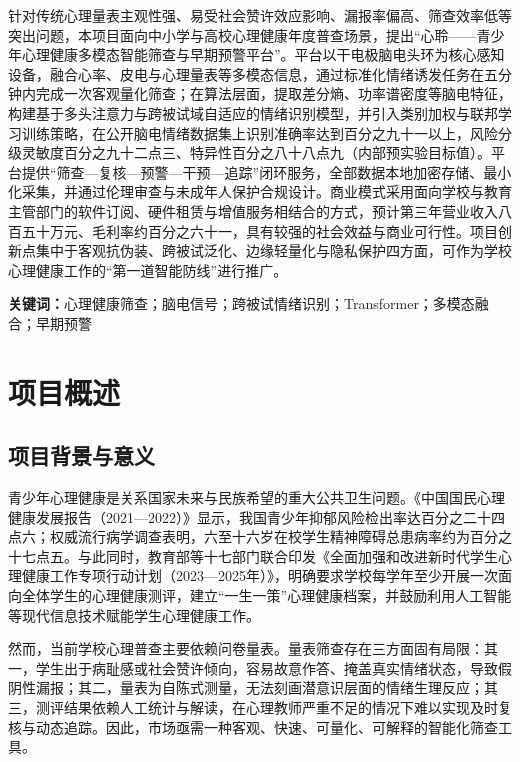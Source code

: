\documentclass[zihao=-4,fontset=windows,a4paper]{ctexart}
\begin{document}
针对传统心理量表主观性强、易受社会赞许效应影响、漏报率偏高、筛查效率低等突出问题，本项目面向中小学与高校心理健康年度普查场景，提出“心聆——青少年心理健康多模态智能筛查与早期预警平台”。平台以干电极脑电头环为核心感知设备，融合心率、皮电与心理量表等多模态信息，通过标准化情绪诱发任务在五分钟内完成一次客观量化筛查；在算法层面，提取差分熵、功率谱密度等脑电特征，构建基于多头注意力与跨被试域自适应的情绪识别模型，并引入类别加权与联邦学习训练策略，在公开脑电情绪数据集上识别准确率达到百分之九十一以上，风险分级灵敏度百分之九十二点三、特异性百分之八十八点九（内部预实验目标值）。平台提供“筛查—复核—预警—干预—追踪”闭环服务，全部数据本地加密存储、最小化采集，并通过伦理审查与未成年人保护合规设计。商业模式采用面向学校与教育主管部门的软件订阅、硬件租赁与增值服务相结合的方式，预计第三年营业收入八百五十万元、毛利率约百分之六十一，具有较强的社会效益与商业可行性。项目创新点集中于客观抗伪装、跨被试泛化、边缘轻量化与隐私保护四方面，可作为学校心理健康工作的“第一道智能防线”进行推广。

\vspace{0.4em}
\noindent\textbf{关键词：}心理健康筛查；脑电信号；跨被试情绪识别；Transformer；多模态融合；早期预警

\newpage

\section{项目概述}

\subsection{项目背景与意义}

青少年心理健康是关系国家未来与民族希望的重大公共卫生问题。《中国国民心理健康发展报告（2021—2022）》显示，我国青少年抑郁风险检出率达百分之二十四点六\cite{ref2}；权威流行病学调查表明，六至十六岁在校学生精神障碍总患病率约为百分之十七点五\cite{ref2}。与此同时，教育部等十七部门联合印发《全面加强和改进新时代学生心理健康工作专项行动计划（2023—2025年）》，明确要求学校每学年至少开展一次面向全体学生的心理健康测评，建立“一生一策”心理健康档案，并鼓励利用人工智能等现代信息技术赋能学生心理健康工作\cite{ref1,ref3}。

然而，当前学校心理普查主要依赖问卷量表。量表筛查存在三方面固有局限：其一，学生出于病耻感或社会赞许倾向，容易故意作答、掩盖真实情绪状态，导致假阴性漏报；其二，量表为自陈式测量，无法刻画潜意识层面的情绪生理反应；其三，测评结果依赖人工统计与解读，在心理教师严重不足的情况下难以实现及时复核与动态追踪。因此，市场亟需一种客观、快速、可量化、可解释的智能化筛查工具。
\end{document}
